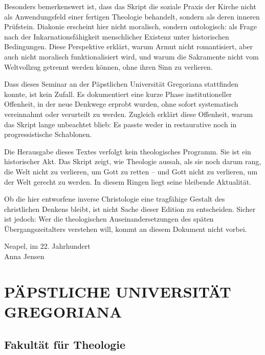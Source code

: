 \documentclass[
]{article}
\begin{document}
Besonders bemerkenswert ist, dass das Skript die soziale Praxis der Kirche nicht als Anwendungsfeld einer fertigen Theologie behandelt, sondern als deren inneren Prüfstein. Diakonie erscheint hier nicht moralisch, sondern ontologisch: als Frage nach der Inkarnationsfähigkeit menschlicher Existenz unter historischen Bedingungen. Diese Perspektive erklärt, warum Armut nicht romantisiert, aber auch nicht moralisch funktionalisiert wird, und warum die Sakramente nicht vom Weltvollzug getrennt werden können, ohne ihren Sinn zu verlieren.

Dass dieses Seminar an der Päpstlichen Universität Gregoriana stattfinden konnte, ist kein Zufall. Es dokumentiert eine kurze Phase institutioneller Offenheit, in der neue Denkwege erprobt wurden, ohne sofort systematisch vereinnahmt oder verurteilt zu werden. Zugleich erklärt diese Offenheit, warum das Skript lange unbeachtet blieb: Es passte weder in restaurative noch in progressistische Schablonen.

Die Herausgabe dieses Textes verfolgt kein theologisches Programm. Sie ist ein historischer Akt. Das Skript zeigt, wie Theologie aussah, als sie noch darum rang, die Welt nicht zu verlieren, um Gott zu retten – und Gott nicht zu verlieren, um der Welt gerecht zu werden. In diesem Ringen liegt seine bleibende Aktualität.

Ob die hier entworfene inverse Christologie eine tragfähige Gestalt des christlichen Denkens bleibt, ist nicht Sache dieser Edition zu entscheiden. Sicher ist jedoch: Wer die theologischen Auseinandersetzungen des späten Übergangszeitalters verstehen will, kommt an diesem Dokument nicht vorbei.

Neapel, im 22. Jahrhundert\\
Anna Jensen
\section{\texorpdfstring{\hfill\break
}{ }}\label{section-1}


\section{\texorpdfstring{\textbf{PÄPSTLICHE UNIVERSITÄT GREGORIANA}}{PÄPSTLICHE UNIVERSITÄT GREGORIANA}}\label{puxe4pstliche-universituxe4t-gregoriana}

\subsection{\texorpdfstring{\textbf{Fakultät für Theologie}}{Fakultät für Theologie}}\label{fakultuxe4t-fuxfcr-theologie}
\end{document}
